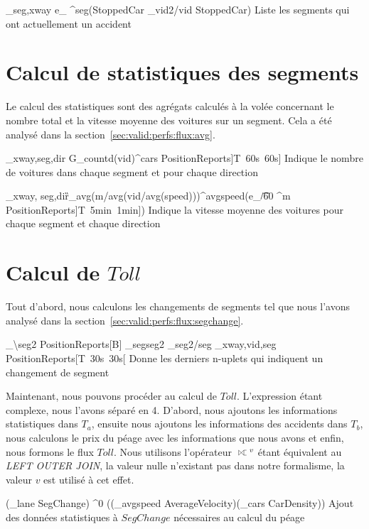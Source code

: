 	{\Pi_{seg,xway} e_{\left\lfloor {} \right\rfloor}^{seg}(StoppedCar \Join \rho_{vid2/vid} StoppedCar)}
	{Liste les segments qui ont actuellement un accident}

\section{Calcul de statistiques des segments}
Le calcul des statistiques sont des agrégats calculés à la volée concernant le nombre total et la vitesse moyenne des voitures sur un segment. Cela a été analysé dans la section~\ref{sec:valid:perfs:flux:avg}.

	{\null_{xway,seg,dir} G_{countd(vid)}^{cars} PositionReports]T\ 60s\ 60s]}
	{Indique le nombre de voitures dans chaque segment et pour chaque direction}

	{\null_{xway, seg,dir}\G_{avg(m/avg(vid/avg(speed)))}^{avgspeed}(e_{\lfloor \t/60 \rfloor}^{m} PositionReports]T\ 5min\ 1min])}
	{Indique la vitesse moyenne des voitures pour chaque segment et chaque direction}

\section{Calcul de $Toll$}
Tout d'abord, nous calculons les changements de segments tel que nous l'avons analysé dans la section~\ref{sec:valid:perfs:flux:segchange}.

	{\Pi_{\backslash seg2} PositionReports[B] \mathop{\Join}_{seg\neq seg2} \rho_{seg2/seg} \Pi_{xway,vid,seg} PositionReports[T\ 30s\ 30s[}
	{Donne les derniers n-uplets qui indiquent un changement de segment}

Maintenant, nous pouvons procéder au calcul de $Toll$. L'expression étant complexe, nous l'avons séparé en 4. D'abord, nous ajoutons les informations statistiques dans $T_a$, ensuite nous ajoutons les informations des accidents dans $T_b$, nous calculons le prix du péage avec les informations que nous avons et enfin, nous formons le flux $Toll$. Nous utilisons l'opérateur $\lojoin^v$ étant équivalent au \textit{LEFT OUTER JOIN}, la valeur nulle n'existant pas dans notre formalisme, la valeur $v$ est utilisé à cet effet.

	{(\sigma_{lane } SegChange) \lojoin^{0} ((\sigma_{avgspeed } AverageVelocity)\Join (\sigma_{cars } CarDensity))}
	{Ajout des données statistiques à $SegChange$ nécessaires au calcul du péage}

